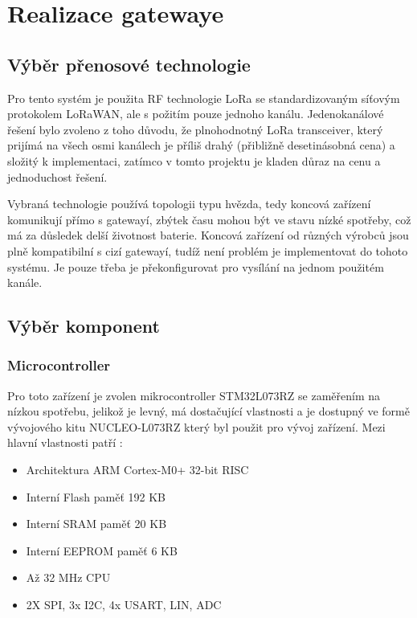 \chapter{Realizace gatewaye}

\section{Výběr přenosové technologie}
Pro tento systém je použita RF technologie LoRa se standardizovaným síťovým protokolem LoRaWAN, ale s požitím pouze jednoho kanálu.
Jedenokanálové řešení bylo zvoleno z toho důvodu, že plnohodnotný LoRa transceiver, který prijímá na všech osmi kanálech je příliš drahý (přibližně desetinásobná cena) a složitý k implementaci, zatímco v tomto projektu je kladen důraz na cenu a jednoduchost řešení.

Vybraná technologie používá topologii typu hvězda, tedy koncová zařízení komunikují přímo s gatewayí, zbýtek času mohou být ve stavu nízké spotřeby, což má za důsledek delší životnost baterie.
Koncová zařízení od různých výrobců jsou plně kompatibilní s cizí gatewayí, tudíž není problém je implementovat do tohoto systému. Je pouze třeba je překonfigurovat pro vysílání na jednom použitém kanále.



\section{Výběr komponent}
\subsection{Microcontroller}
Pro toto zařízení je zvolen mikrocontroller STM32L073RZ se zaměřením na nízkou spotřebu, jelikož je levný, má dostačující vlastnosti a je dostupný ve formě vývojového kitu NUCLEO-L073RZ který byl použit pro  vývoj zařízení. Mezi hlavní vlastnosti patří \cite{nucleoST}:
\begin{itemize}    
    \item {Architektura ARM Cortex-M0+ 32-bit RISC}
    \item{Interní Flash paměť 192 KB}
    \item{Interní SRAM paměť 20 KB}
    \item{Interní EEPROM paměť 6 KB}
    \item {Až 32 MHz CPU}
    \item {2X SPI, 3x I2C, 4x USART, LIN, ADC}
\end{itemize}

